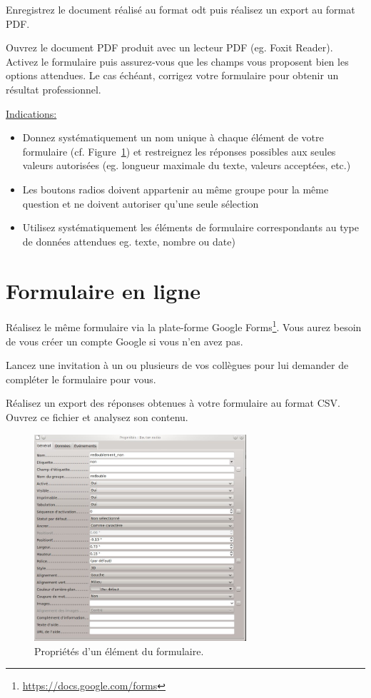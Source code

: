 \documentclass[a4paper, 9pt]{article}
\begin{document}
 \exost Enregistrez le document r\'ealis\'e au format odt puis r\'ealisez un export au format PDF. 
 
 \exost Ouvrez le document PDF produit avec un lecteur PDF (eg. Foxit Reader). Activez le formulaire puis assurez-vous que les champs vous proposent bien les options attendues.
 Le cas \'ech\'eant, corrigez votre formulaire pour obtenir un r\'esultat professionnel.

 \underline{Indications:}
 \begin{itemize}
  \item Donnez syst\'ematiquement un nom unique \`a chaque \'el\'ement de votre formulaire (cf. Figure~\ref{fig:prop}) et restreignez les r\'eponses possibles aux seules valeurs autoris\'ees 
  (eg. longueur maximale du texte, valeurs accept\'ees, etc.)
  \item Les boutons radios doivent appartenir au m\^eme groupe pour la m\^eme question et ne doivent autoriser qu'une seule s\'election
  \item Utilisez syst\'ematiquement les \'el\'ements de formulaire correspondants au type de donn\'ees attendues eg. texte, nombre ou date)
 \end{itemize}

 
\section{Formulaire en ligne}

\exost R\'ealisez le m\^eme formulaire via la plate-forme Google Forms\footnote{\url{https://docs.google.com/forms}}. Vous aurez besoin de vous cr\'eer un compte Google
si vous n'en avez pas.

\exost Lancez une invitation \`a un ou plusieurs de vos coll\`egues pour lui demander de compl\'eter le formulaire pour vous.

\exost R\'ealisez un export des r\'eponses obtenues \`a votre formulaire au format CSV. Ouvrez ce fichier et analysez son contenu.

\begin{figure}[ht]
 \centering\includegraphics[width=0.7\textwidth]{forms.jpg}
 \caption{Propri\'et\'es d'un \'el\'ement du formulaire.}
 \label{fig:prop}
\end{figure}
\end{document}
